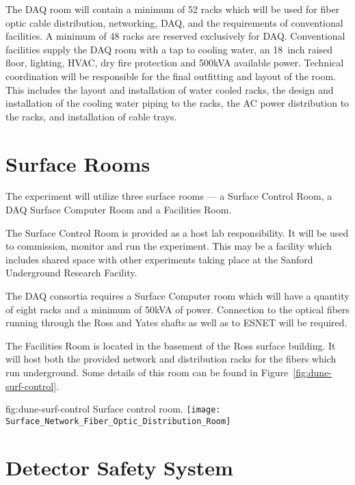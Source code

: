 The DAQ room will contain a minimum of 52 racks which will be used for
fiber optic cable distribution, networking,  DAQ, and the
requirements of conventional facilities.  A minimum of 48 racks are
reserved exclusively for DAQ.  Conventional facilities supply the DAQ
room with a tap to cooling water, an 18~inch raised floor, lighting,
HVAC, dry fire protection and 500kVA available power.  Technical
coordination will be responsible for the final outfitting and layout
of the room.  This includes the layout and installation of water
cooled racks, the design and installation of the cooling water piping
to the racks, the AC power distribution to the racks, and installation
of cable trays.

\section{Surface Rooms}
\label{sec:fdsp-coord-surf-rooms}

The  experiment will utilize three surface rooms --- a Surface
Control Room, a DAQ Surface Computer Room and a Facilities Room.

The  Surface Control Room is provided as a host lab
responsibility.  It will be used to commission, monitor and run the
experiment.  This may be a facility which includes shared space with
other experiments taking place at the Sanford Underground Research
Facility.

The DAQ consortia requires a Surface Computer room which will have a
quantity of eight racks and a minimum of 50kVA of power.  Connection
to the optical fibers running through the Ross and Yates shafts as
well as to ESNET will be required.

The Facilities Room is located in the basement of the Ross surface
building.  It will host both the \fnal provided network and
distribution racks for the fibers which run underground. Some details
of this room can be found in Figure~\ref{fig:dune-surf-control}.
\begin{dunefigure}{fig:dune-surf-control}
  {Surface control room.}
  \texttt{[image: Surface\_Network\_Fiber\_Optic\_Distribution\_Room]}
\end{dunefigure}

\section{ Detector Safety System}
\label{sec:fdsp-coord-det-safety}

